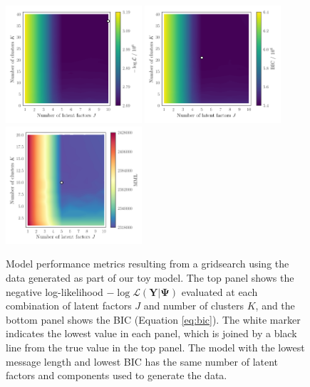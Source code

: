 \documentclass[twocolumn]{aastex62}
\newcommand{\vect}[1]{\boldsymbol{\mathbf{#1}}}
\renewcommand{\vec}[1]{\vect{#1}}
\newcommand{\data}{\textbf{Y}}
\begin{document}
\begin{figure}
	\includegraphics[width=0.45\textwidth]{experiments/exp1-gridsearch-ll-contours.png}
	\includegraphics[width=0.45\textwidth]{experiments/exp1-gridsearch-bic-contours.png}
	\includegraphics[width=0.45\textwidth]{experiments/exp1-gridsearch-mml-contours.png}
    \caption{Model performance metrics resulting from a gridsearch using the
    		 data generated as part of our toy model. The top 
		 	 panel shows the negative log-likelihood 
			 $-\log{\mathcal{L}\left(\data|\vec\Psi\right)}$ 
			 evaluated at each combination of latent factors $J$ and number 
			 of clusters $K$, and the bottom panel shows the BIC (Equation \ref{eq:bic}).
			 The white marker indicates the 
			 lowest value in each panel, which is joined by a black line from the true value
			 in the top panel. The model with the lowest message length and lowest BIC has
			 the same number of latent factors and components used to generate the data.
		}
    \label{fig:experiment-1-gridsearch}
\end{figure}
\end{document}
